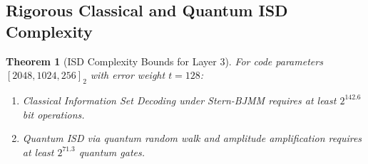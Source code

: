 \documentclass{ieeeaccess}
\newtheorem{theorem}{Theorem}
\begin{document}
\subsection{Rigorous Classical and Quantum ISD Complexity}
\begin{theorem}[ISD Complexity Bounds for Layer 3]
\label{thm:L3-isd}
For code parameters $[2048, 1024, 256]_2$ with error weight $t=128$:
\begin{enumerate}
  \item Classical Information Set Decoding under Stern-BJMM requires at least $2^{142.6}$ bit operations.
  \item Quantum ISD via quantum random walk and amplitude amplification requires at least $2^{71.3}$ quantum gates.
\end{enumerate}
\end{theorem}
\end{document}
